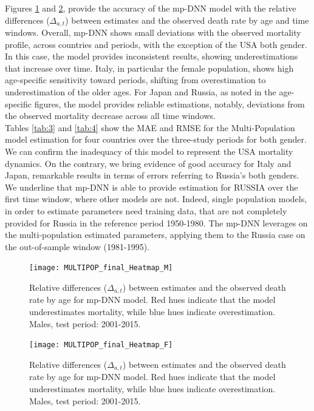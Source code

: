 \documentclass[a4,11pt]{article}
\begin{document}
Figures \ref{fig:MP.relative.diff.MALE} and \ref{fig:MP.relative.diff.FEMALE}, provide the accuracy of the mp-DNN model with the relative differences ($\Delta_{a,t}$) between estimates and the observed death rate by age and time windows.
Overall, mp-DNN shows small deviations with the observed mortality profile, across countries and periods, with the exception of the USA both gender. In this case, the model provides inconsistent results, showing underestimations that increase over time.
Italy, in particular the female population, shows high age-specific sensitivity toward periods, shifting from overestimation to underestimation of the older ages.
For Japan and Russia, as noted in the age-specific figures, the model provides reliable estimations, notably, deviations from the observed mortality decrease across all time windows.\\

Tables \ref{tab:3} and \ref{tab:4} show the MAE and RMSE for the Multi-Population model estimation for four countries over the three-study periods for both gender. 
We can confirm the inadequacy of this model to represent the USA mortality dynamics. On the contrary, we bring evidence of good accuracy for Italy and Japan, remarkable results in terms of errors referring to Russia's both genders.
We underline that mp-DNN is able to provide estimation for RUSSIA over the first time window, where other models are not. Indeed, 
single population models, in order to estimate parameters need training data, that are not completely provided for Russia in the reference period 1950-1980. The mp-DNN leverages on the multi-population estimated parameters, applying them to the Russia case on the out-of-sample window (1981-1995).\\

\begin{figure}[H]
	\centering
	\texttt{[image: MULTIPOP\_final\_Heatmap\_M]}\\
	 \caption{Relative differences ($\Delta_{a,t}$) between estimates and the observed death rate by age for mp-DNN model. Red hues indicate that the model underestimates mortality, while blue hues indicate overestimation. Males, test period: 2001-2015.}
	 \label{fig:MP.relative.diff.MALE}
\end{figure}

\begin{figure}[H]
	\centering
	\texttt{[image: MULTIPOP\_final\_Heatmap\_F]}\\
	 \caption{Relative differences ($\Delta_{a,t}$) between estimates and the observed death rate by age for mp-DNN model. Red hues indicate that the model underestimates mortality, while blue hues indicate overestimation. Males, test period: 2001-2015.}
	 \label{fig:MP.relative.diff.FEMALE}
\end{figure}
\end{document}
